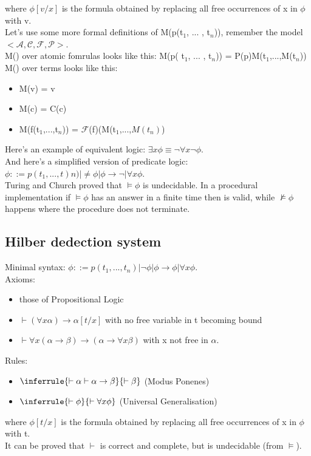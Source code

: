\documentclass[12pt]{article}
\begin{document}
where $\phi[v/x]$ is the formula obtained by replacing all free occurrences of x in $\phi$ with v.
\\ Let's use some more formal definitions of M(p(t$_1$, ... , t$_n$)), remember the model $<\mathcal{A,C,F,P}>$. \\ M() over atomic fomrulas looks like this: 
M(p( t$_1$, ... , t$_n$)) = P(p)M(t$_1$,...,M(t$_n$))
\\ M() over terms looks like this:
\begin{itemize}
    \item M(v) = v
    \item M(c) = C(c)
    \item M(f(t$_1$,...,t$_n$)) = $\mathcal{F}$(f)(M(t$_1$,...,$M(t_n)$)
\end{itemize}
Here's an example of equivalent logic: $\exists x \phi \equiv \neg \forall x \neg \phi$.
\\ And here's a simplified version of predicate logic: 
$\phi ::= p(t_1,...,t)n) | \neq \phi | \phi \rightarrow \neg | \forall x \phi$.
\vspace{5mm} 
\\ Turing and Church proved that $\models \phi$ is undecidable. In a procedural implementation if $\models \phi$ has an answer in a finite time then is valid, while $\not\models \phi$ happens where the procedure does not terminate.

\subsection{Hilber dedection system} 
Minimal syntax: $\phi ::= p(t_1,...,t_n) | \neg \phi | \phi \rightarrow \phi | \forall x \phi$.
\\ Axioms:
\begin{itemize}
    \item those of Propositional Logic
    \item $\vdash (\forall x \alpha) \rightarrow \alpha[t/x]$ with no free variable in t becoming bound 
    \item $\vdash \forall x (\alpha \rightarrow \beta) \rightarrow (\alpha \rightarrow \forall x \beta)$ with x not free in $\alpha$.
\end{itemize}
Rules: 
\begin{itemize}
    \item $\inferrule
            { \vdash \alpha \vdash \alpha \rightarrow \beta}
            { \vdash \beta} $ (Modus Ponenes)
    \item $\inferrule
            { \vdash \phi}
            { \vdash \forall x \phi} $ (Universal Generalisation)
\end{itemize}
where $\phi[t/x]$ is the formula obtained by replacing all free occurrences of x in $\phi$ with t. 
\\ It can be proved that $\vdash$ is correct and complete, but is undecidable (from $\models$).
\end{document}
